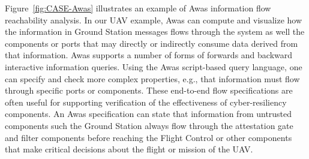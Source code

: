Figure~\ref{fig:CASE-Awas} illustrates an example of Awas information flow reachability analysis.
In our UAV example, Awas can compute and visualize how the information in Ground Station messages flows through the system
as well the components or ports that may directly or indirectly consume data derived from that information.
Awas supports a number of forms of forwards and backward interactive information queries.
Using the Awas script-based query language, one can specify and check more complex properties, e.g.,
that information must flow through specific ports or components.
These end-to-end flow specifications are often useful for supporting verification of the
effectiveness of cyber-resiliency components.   An Awas specification can state that
information from untrusted components such the Ground Station always flow through the
attestation gate and filter components before reaching the Flight Control or other components
that make critical decisions about the flight or mission of the UAV.

